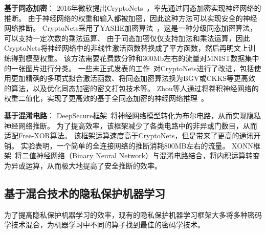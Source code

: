 \textbf{基于同态加密}：
2016年微软提出CryptoNets~\cite{gilad2016cryptonets}，率先通过同态加密实现神经网络的推断。
%
由于神经网络的权重和输入都被加密，因此这种方法可以实现安全的神经网络推断。
%
CryptoNets采用了YASHE加密算法~\cite{bos2013yashe}，这是一种分级同态加密算法，可以支持一定次数的乘法运算、
%
由于同态加密仅仅支持加法和乘法运算，因此CryptoNets将神经网络中的非线性激活函数替换成了平方函数，然后再明文上训练得到模型权重。
%
该方法需要花费数分钟和300Mb左右的流量对MNIST数据集中的一张图片进行分类。
%
%
一些未正式发表的工作~\cite{hesamifard2017cryptodl,chabanne2017pp_dnn}对CryptoNets进行了改进，包括使用更加精确的多项式拟合激活函数、将同态加密算法换为BGV或CKKS等更高效的算法，以及优化同态加密的密文打包技术等。
%
Zhou等人通过将卷积神经网络的权重二值化，实现了更高效的基于全同态加密的神经网络推理~\cite{zhoujunwei2020binary_encrypted_nn}。

\textbf{基于混淆电路}：
DeepSecure框架~\cite{rouhani2018deepsecure}将神经网络模型转化为布尔电路，从而实现隐私神经网络推断。
%
为了提高效率，该框架减少了各类电路中的非异或门数目，从而适配Free-XOR算法。
%
该框架运算速度高于CryptoNets，但是带来了更高的通讯开销。
%
实验表明，一个简单的全连接网络的推断消耗800MB左右的流量。
%
XONN框架~\cite{riazi2019xonn}将二值神经网络（Binary Neural Network）与混淆电路结合，将内积运算转变为异或运算，从而极大地提高了安全推断的效率。


\subsection{基于混合技术的隐私保护机器学习}
为了提高隐私保护机器学习的效率，现有的隐私保护机器学习框架大多将多种密码学技术混合，为机器学习中不同的算子找到最佳的密码学技术。
%

